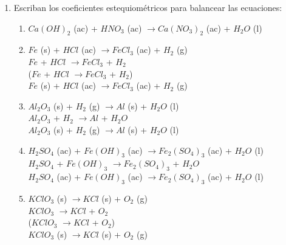 \documentclass[../Práctica.root.tex]{subfiles}
\newcommand{\lra}{\ensuremath{\longrightarrow{}}}
\begin{document}
\begin{enumerate}
    \item Escriban los coeficientes estequiométricos para balancear las ecuaciones:
          \begin{enumerate}
              \item $Ca(OH)_2$ (ac) + $HNO_3$ (ac) \lra \blue{}$Ca(NO_3)_2$ (ac) + $H_2O$ (l)
              \item $Fe$ (s) + $HCl$ (ac) \lra $FeCl_3$ (ac) + $H_2$ (g) \\
                    $Fe$ + $HCl$ \lra $FeCl_3$ + $H_2$ \\
                    ($Fe$ + $HCl$ \lra $FeCl_3$ + $H_2$)\cdot{} \\
                    $Fe$ (s) + $HCl$ (ac) \lra {}$FeCl_3$ (ac) + $H_2$ (g)
              \item $Al_2O_3$ (s) + $H_2$ (g) \lra $Al$ (s) + $H_2O$ (l) \\
                    $Al_2O_3$ + $H_2$ \lra {}$Al$ + $H_2O$ \\
                    $Al_2O_3$ (s) + $H_2$ (g) \lra {}$Al$ (s) + $H_2O$ (l)
              \item $H_2SO_4$ (ac) + $Fe(OH)_3$ (ac) \lra $Fe_2(SO_4)_3$ (ac) + $H_2O$ (l) \\
                    $H_2SO_4$ + $Fe(OH)_3$ \lra $Fe_2(SO_4)_3$ + $H_2O$ \\
                    $H_2SO_4$ (ac) + $Fe(OH)_3$ (ac) \lra $Fe_2(SO_4)_3$ (ac) + $H_2O$ (l)
              \item $KClO_3$ (s) \lra $KCl$ (s) + $O_2$ (g) \\
                    $KClO_3$ \lra $KCl$ + $O_2$ \\
                    ($KClO_3$ \lra $KCl$ + $O_2$)\cdot{} \\
                    $KClO_3$ (s) \lra {}$KCl$ (s) + $O_2$ (g)
          \end{enumerate}


\end{enumerate}
\end{document}
